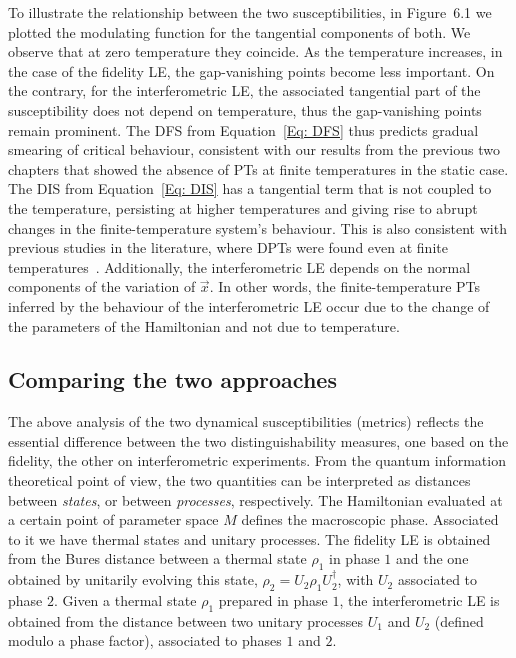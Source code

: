 To illustrate the relationship between the two susceptibilities, in Figure~6.1 we plotted the modulating function for the tangential components of both. We observe that at zero temperature they coincide. As the temperature increases, in the case of the fidelity LE, the gap-vanishing points become less important. On the contrary, for the interferometric LE, the associated tangential part of the susceptibility does not depend on temperature, thus the gap-vanishing points remain prominent. The DFS from Equation~\eqref{Eq: DFS} thus predicts gradual smearing of critical behaviour, consistent with our results from the previous two chapters that showed the absence of PTs at finite temperatures in the static case. The DIS from Equation~\eqref{Eq: DIS} has a tangential term that is not coupled to the temperature, persisting at higher temperatures and giving rise to abrupt changes in the finite-temperature system's behaviour. This is also consistent with previous studies in the literature, where DPTs were found even at finite temperatures~\cite{hey:bud:17, bah:ban:dut:17}. Additionally, the interferometric LE depends on the normal components of the variation of $\vec{x}$. In other words, the finite-temperature PTs inferred by the behaviour of the interferometric LE occur due to the change of the parameters of the Hamiltonian and not due to temperature. 


\subsection{Comparing the two approaches}

The above analysis of the two dynamical susceptibilities (metrics) reflects the essential difference between the two distinguishability measures, one based on the fidelity, the other on  interferometric experiments. From the quantum information theoretical point of view, the two quantities can be interpreted as distances between \emph{states}, or between \emph{processes}, respectively. The Hamiltonian evaluated at a certain point of parameter space $M$ defines the macroscopic phase. Associated to it we have thermal states and unitary processes. The fidelity LE is obtained from the Bures distance between a thermal state $\rho_1$ in phase $1$ and the one obtained by unitarily evolving this state, $\rho_2 = U_2\rho_1 U_2^{\dagger}$, with $U_2$ associated to phase $2$.  Given a thermal state $\rho_1$ prepared in phase $1$, the interferometric LE is obtained from the distance between two unitary processes $U_1$ and $U_2$ (defined modulo a phase factor), associated to phases $1$ and $2$.  

